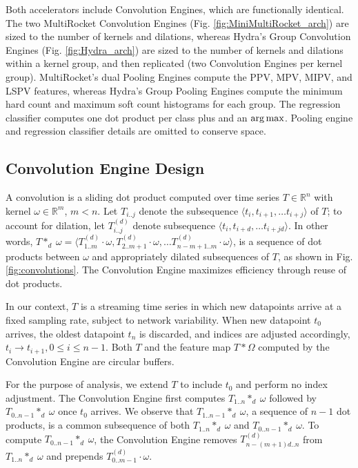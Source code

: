 Both accelerators include Convolution Engines, which are functionally identical. The two MultiRocket Convolution Engines (Fig. \ref{fig:MiniMultiRocket_arch}) are sized to the number of kernels and dilations, whereas Hydra's Group Convolution Engines (Fig. \ref{fig:Hydra_arch}) are sized to the number of kernels and dilations within a kernel group, and then replicated (two Convolution Engines per kernel group). MultiRocket's dual Pooling Engines compute the PPV, MPV, MIPV, and LSPV features, whereas Hydra's Group Pooling Engines compute the minimum hard count and maximum soft count histograms for each group. The regression classifier computes one dot product per class plus and an $\operatorname*{arg\,max}$. Pooling engine and regression classifier details are omitted to conserve space. 

\subsection{Convolution Engine Design}
\label{sec:conv_engine}

A convolution is a sliding dot product computed over time series $T \in \mathbb{R}^n$ with kernel $\omega \in \mathbb{R}^m$, $m < n$. Let $T_{i..j}$ denote the subsequence $\langle t_i, t_{i+1}, \ldots t_{i+j} \rangle$ of $T$; to account for dilation, let $T^{(d)}_{i..j}$ denote subsequence $\langle t_i, t_{i+d}, \ldots t_{i+jd} \rangle$. In other words, $T *_d \ \omega = \langle T^{(d)}_{1..m} \cdot \omega, T^{(d)}_{2..m+1} \cdot \omega, \ldots T^{(d)}_{n-m+1..m} \cdot \omega \rangle$, is a sequence of dot products between $\omega$ and appropriately dilated subsequences of $T$, as shown in Fig. \ref{fig:convolutions}. The Convolution Engine maximizes efficiency through reuse of dot products. 


In our context, $T$ is a streaming time series in which new datapoints arrive at a fixed sampling rate, subject to network variability. When new datapoint $t_0$ arrives, the oldest datapoint $t_n$ is discarded, and indices are adjusted accordingly, $t_i\rightarrow t_{i+1}, 0 \leq i \leq n-1$. Both $T$ and the feature map $T * \Omega$ computed by the Convolution Engine are circular buffers. 

For the purpose of analysis, we extend $T$ to include $t_0$ and perform no index adjustment. The Convolution Engine first computes $T_{1..n} *_d\ \omega$ followed by $T_{0..n-1} *_d\ \omega$ once $t_0$ arrives. We observe that $T_{1..n-1} *_d\ \omega$, a sequence of $n-1$ dot products, is a common subsequence of both $T_{1..n} *_d\ \omega$ and $T_{0..n-1} *_d\ \omega$. To compute $T_{0..n-1} *_d\ \omega$, the Convolution Engine removes $T^{(d)}_{n -(m+1)d..n}$ from $T_{1..n} *_d\ \omega$ and prepends $T^{(d)}_{0..m-1} \cdot \omega$.

